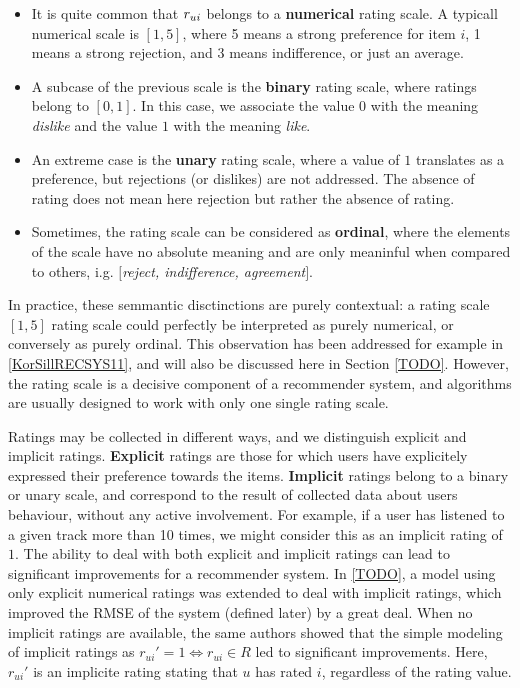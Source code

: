 \begin{itemize}
  \item It is quite common that  $r_{ui}$ belongs to a \textbf{numerical} rating
    scale. A typicall numerical scale is $[1, 5]$, where  5 means a strong
    preference for item $i$, 1 means a strong rejection, and 3 means
    indifference, or just an average.
  \item A subcase of the previous scale is the \textbf{binary} rating scale,
    where ratings belong to $[0, 1]$. In this case, we associate the value $0$
    with the meaning \textit{dislike} and the value $1$ with the meaning
    \textit{like}.
  \item An extreme case is the \textbf{unary} rating scale, where a value of
    $1$ translates as a preference, but rejections (or dislikes) are not
    addressed. The absence of rating does not mean here rejection but rather
    the absence of rating.
  \item Sometimes, the rating scale can be considered as \textbf{ordinal},
    where the elements of the scale have no absolute meaning and are only
    meaninful when compared to others, i.g. $[$\textit{reject, indifference,
    agreement}$]$.
\end{itemize}
In practice, these semmantic disctinctions are purely contextual: a rating
scale $[1, 5]$ rating scale could perfectly be interpreted as purely numerical,
or conversely as purely ordinal. This observation has been addressed for
example in \ref{KorSillRECSYS11}, and will also be discussed here in Section
\ref{TODO}. However, the rating scale is a decisive component of a recommender
system, and algorithms are usually designed to work with only one single rating
scale.

Ratings may be collected in different ways, and we distinguish explicit and
implicit ratings. \textbf{Explicit} ratings are those for which users have
explicitely expressed their preference towards the items. \textbf{Implicit}
ratings belong to a binary or unary scale, and correspond to the result of
collected data about users behaviour, without any active involvement. For
example, if a user has listened to a given track more than 10 times, we might
consider this as an implicit rating of $1$. The ability to deal with both
explicit and implicit ratings can lead to significant improvements for a
recommender system. In \ref{TODO}, a model using only explicit numerical
ratings was extended to deal with implicit ratings, which improved the RMSE of
the system (defined later) by a great deal. When no implicit ratings are
available, the same authors showed that the simple modeling of implicit ratings
as $r_{ui}' = 1 \iff r_{ui} \in R$ led to significant improvements. Here,
$r_{ui}'$ is an implicite rating stating that $u$ has rated $i$, regardless of
the rating value.


